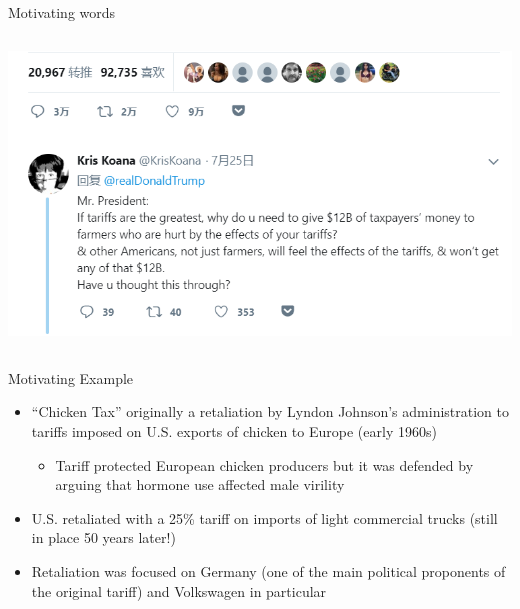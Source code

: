 \documentclass[10pt,hyperref={CJKbookmarks=true},xcolor=dvipsnames,aspectratio=169]{beamer}
\begin{document}
\begin{frame}{Motivating words}
\begin{columns}
\begin{column}{0.4\textwidth}
 	\includegraphics[scale=0.4]{fig/instruments/trump2.png}
 \end{column}
 \end{columns}

\end{frame}

\begin{frame}{Motivating Example}

\begin{itemize}
	\item “Chicken Tax” originally a retaliation by Lyndon Johnson’s administration
	to tariffs imposed on U.S. exports of chicken to Europe (early 1960s) 
	
	\begin{itemize}
		\item Tariff protected European chicken producers but it was defended by
		arguing that hormone use affected male virility 
	\end{itemize}
	\item U.S. retaliated with a 25\% tariff on imports of light commercial
	trucks (still in place 50 years later!) 
	\item Retaliation was focused on Germany (one of the main political proponents
	of the original tariff) and Volkswagen in particular
\end{itemize}
\end{frame}
\end{document}
